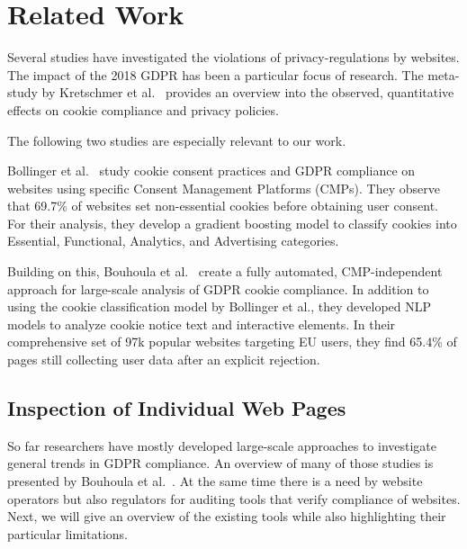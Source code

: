 \chapter{Related Work}

Several studies have investigated the violations of privacy-regulations by websites.
The impact of the 2018 GDPR has been a particular focus of research.
The meta-study by Kretschmer et al.~\cite{kretschmer2021cookie} provides an overview into the observed, quantitative effects on cookie compliance and privacy policies.

The following two studies are especially relevant to our work.

Bollinger et al.~\cite{bollinger2022automating} study cookie consent practices and GDPR compliance on websites using specific Consent Management Platforms (CMPs). 
They observe that 69.7\% of websites set non-essential cookies before obtaining user consent. 
For their analysis, they develop a gradient boosting model to classify cookies into Essential, Functional, Analytics, and Advertising categories.

Building on this, Bouhoula et al.~\cite{bouhoula2023automated} create a fully automated, CMP-independent approach for large-scale analysis of GDPR cookie compliance. 
In addition to using the cookie classification model by Bollinger et al., they developed NLP models to analyze cookie notice text and interactive elements. 
In their comprehensive set of 97k popular websites targeting EU users, they find 65.4\% of pages still collecting user data after an explicit rejection.


\section{Inspection of Individual Web Pages}
So far researchers have mostly developed large-scale approaches to investigate general trends in GDPR compliance. 
An overview of many of those studies is presented by Bouhoula et al.~\cite{bouhoula2023automated}.
At the same time there is a need by website operators but also regulators for auditing tools that verify compliance of websites.
Next, we will give an overview of the existing tools while also highlighting their particular limitations.


